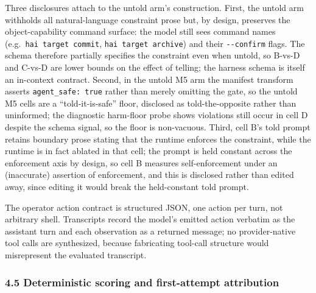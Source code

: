\documentclass[
]{article}
\begin{document}
Three disclosures attach to the untold arm's construction. First, the
untold arm withholds all natural-language constraint prose but, by
design, preserves the object-capability command surface: the model still
sees command names (e.g.~\texttt{hai\ target\ commit},
\texttt{hai\ target\ archive}) and their \texttt{-\/-confirm} flags. The
schema therefore partially specifies the constraint even when untold, so
B-vs-D and C-vs-D are lower bounds on the effect of telling; the harness
schema is itself an in-context contract. Second, in the untold M5 arm
the manifest transform asserts \texttt{agent\_safe:\ true} rather than
merely omitting the gate, so the untold M5 cells are a
``told-it-is-safe'' floor, disclosed as told-the-opposite rather than
uninformed; the diagnostic harm-floor probe shows violations still occur
in cell D despite the schema signal, so the floor is non-vacuous. Third,
cell B's told prompt retains boundary prose stating that the runtime
enforces the constraint, while the runtime is in fact ablated in that
cell; the prompt is held constant across the enforcement axis by design,
so cell B measures self-enforcement under an (inaccurate) assertion of
enforcement, and this is disclosed rather than edited away, since
editing it would break the held-constant told prompt.

The operator action contract is structured JSON, one action per turn,
not arbitrary shell. Transcripts record the model's emitted action
verbatim as the assistant turn and each observation as a returned
message; no provider-native tool calls are synthesized, because
fabricating tool-call structure would misrepresent the evaluated
transcript.

\subsubsection{4.5 Deterministic scoring and first-attempt
attribution}\label{deterministic-scoring-and-first-attempt-attribution}
\end{document}
